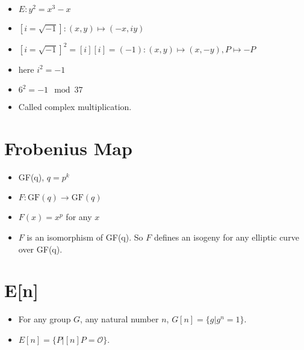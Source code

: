 \begin{itemize}
	\item \( E: y^2 = x^3 - x \)
	\item \( [i=\sqrt{-1}]: (x, y) \mapsto (-x, iy) \)
	\item \( [i=\sqrt{-1}]^2 = [i][i]=(-1): (x, y) \mapsto (x, -y), P \mapsto -P \)
	\item here \( i^2 = -1 \)
	\item \( 6^2 = -1 \mod 37 \)
	\item Called complex multiplication.
\end{itemize}

\section*{Frobenius Map}

\begin{itemize}
	\item GF(q), \( q = p^k \)
	\item \( F: \text{GF}(q) \to \text{GF}(q) \)
	\item \( F(x) = x^p \) for any \( x \)
	\item \( F \) is an isomorphism of GF(q). So \( F \) defines an isogeny for any elliptic curve over GF(q).
\end{itemize}

\section*{E[n]}

\begin{itemize}
	\item For any group \( G \), any natural number \( n \), \( G[n] = \{g | g^n = 1\} \).
	\item \( E[n] = \{P | [n]P = \mathcal{O}\} \).
\end{itemize}



